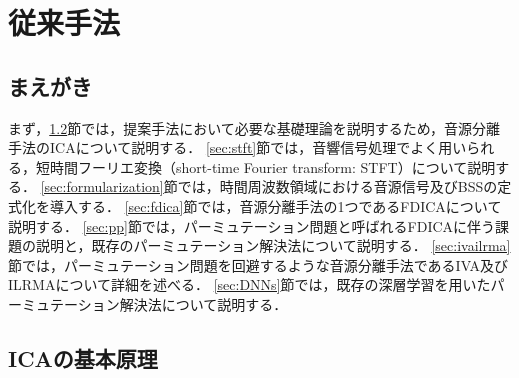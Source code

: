 \chapter{従来手法}
\label{chap:conv}

\section{まえがき}
まず，\ref{sec:ica}節では，提案手法において必要な基礎理論を説明するため，音源分離手法のICAについて説明する．
\ref{sec:stft}節では，音響信号処理でよく用いられる，短時間フーリエ変換（short-time Fourier transform: STFT）について説明する．
\ref{sec:formularization}節では，時間周波数領域における音源信号及びBSSの定式化を導入する．
\ref{sec:fdica}節では，音源分離手法の1つであるFDICAについて説明する．
\ref{sec:pp}節では，パーミュテーション問題と呼ばれるFDICAに伴う課題の説明と，既存のパーミュテーション解決法について説明する．
\ref{sec:ivailrma}節では，パーミュテーション問題を回避するような音源分離手法であるIVA及びILRMAについて詳細を述べる．
\ref{sec:DNNs}節では，既存の深層学習を用いたパーミュテーション解決法について説明する．

\section{ICAの基本原理}
\label{sec:ica}
